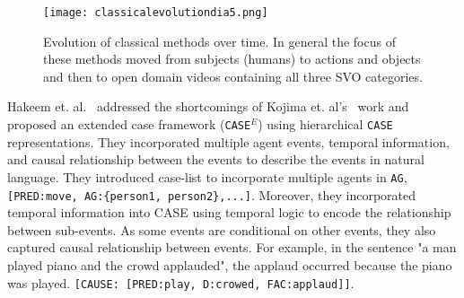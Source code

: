 \documentclass[10pt,journal,compsoc]{IEEEtran}
\begin{document}
\begin{figure*}[t] %
     \centering
     \texttt{[image: classicalevolutiondia5.png]} 
     \vspace{-6mm}
     \caption{Evolution of classical methods over time. In general the focus of these methods moved from subjects (humans) to actions and objects and then to open domain videos containing all three SVO categories.}
  \label{fig:classicalevolutiondia}
  \vspace{-4mm}
  \end{figure*}
  
Hakeem et. al.~\cite{hakeem2004case} addressed the shortcomings of Kojima et. al's~\cite{kojima2002natural} work and proposed an extended case framework ({\tt CASE$^E$}) using hierarchical {\tt CASE} representations. They incorporated multiple agent events, temporal information, and causal relationship between the events to describe the events in natural language. They introduced case-list to incorporate multiple agents in {\tt AG}, {\tt[PRED:move, AG:\{person1, person2\},...]}. Moreover, they incorporated temporal information into CASE using temporal logic to encode the relationship between sub-events. As some events are conditional on other events, they also captured causal relationship between events. For example, in the sentence "a man played piano and the crowd applauded", the applaud occurred because the piano was played. 
{\tt[CAUSE: [PRED:play, D:crowed, FAC:applaud]]}. 
\end{document}
